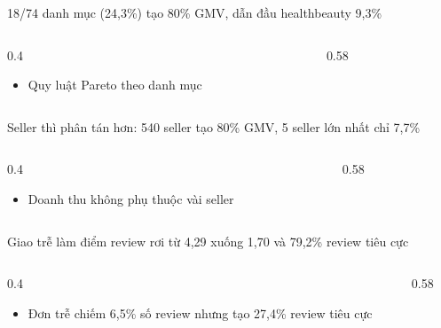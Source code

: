 \begin{frame}{18/74 danh mục (24,3\%) tạo 80\% GMV, dẫn đầu healthbeauty 9,3\%}
\begin{columns}[T]\begin{column}{0.4\textwidth}
\begin{itemize}
  \item Quy luật Pareto theo danh mục
\end{itemize}
\end{column}\begin{column}{0.58\textwidth}
\begin{center}\end{center}
\end{column}\end{columns}

\end{frame}

\begin{frame}{Seller thì phân tán hơn: 540 seller tạo 80\% GMV, 5 seller lớn nhất chỉ 7,7\%}
\begin{columns}[T]\begin{column}{0.4\textwidth}
\begin{itemize}
  \item Doanh thu không phụ thuộc vài seller
\end{itemize}
\end{column}\begin{column}{0.58\textwidth}
\begin{center}\end{center}
\end{column}\end{columns}

\end{frame}

\begin{frame}{Giao trễ làm điểm review rơi từ 4,29 xuống 1,70 và 79,2\% review tiêu cực}
\begin{columns}[T]\begin{column}{0.4\textwidth}
\begin{itemize}
  \item Đơn trễ chiếm 6,5\% số review nhưng tạo 27,4\% review tiêu cực
\end{itemize}
\end{column}\begin{column}{0.58\textwidth}
\begin{center}\end{center}
\end{column}\end{columns}

\end{frame}

